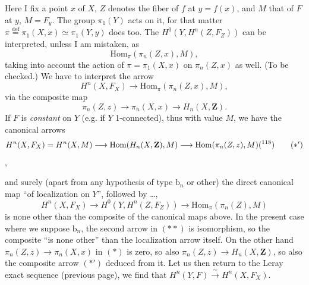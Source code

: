 Here I fix a point $x$ of $X$, $Z$ denotes the fiber of $f$ at $y=f(x)$, and $M$ that of $F$ at $y$, $M=F_y$. The group $\pi_1(Y)$ acts on it, for that matter $\pi \overset{\text{def}}{=} \pi_1(X,x) \simeq \pi_1(Y,y)$ does too. The $H^0(Y,H^n(Z,F_Z))$ can be interpreted, unless I am mistaken, as
\[
\mathrm{Hom}_\pi(\pi_n(Z,x),M),
\]
taking into account the action of $\pi=\pi_1(X,x)$ on $\pi_n(Z,x)$ as well. (To be checked.) We have to interpret the arrow
\[
H^n(X,F_X) \longrightarrow \mathrm{Hom}_\pi(\pi_n(Z,x),M),
\]
via the composite map 
\[
\pi_n(Z,z) \longrightarrow \pi_n(X,x) \longrightarrow H_n(X,\mathbf{Z}). \tag*{$(*)$}
\]
If $F$ is \textit{constant} on $Y$ (e.g. if $Y$ 1-connected), thus with value $M$, we have the canonical arrows
\[
H^n(X,F_X) = H^n(X,M) \longrightarrow \mathrm{Hom}(H_n(X,\mathbf{Z}),M) \longrightarrow \mathrm{Hom}(\pi_n(Z,z),M)\text{(\footnotemark[118])} \tag*{$(*')$}
\]
,

and surely (apart from any hypothesis of type $\mathrm{b}_n$ or other) the direct canonical map ``of localization on $Y$'', followed by \dots,
\[
H^n(X,F_X) \longrightarrow H^0(Y,H^n(Z,F_Z)) \longrightarrow \mathrm{Hom}_\pi(\pi_n(Z),M) \tag*{$(**)$}
\]
is none other than the composite of the canonical maps above. In the present case where we suppose $\mathrm{b}_n$, the second arrow in $(**)$ is isomorphism, so the composite ``is none other'' than the localization arrow itself. On the other hand $\pi_n(Z,z) \longrightarrow \pi_n(X,x)$ in $(*)$ is zero, so also $\pi_n(Z,z) \longrightarrow H_n(X,\mathbf{Z})$, so also the composite arrow $(*')$ deduced from it. Let us then return to the Leray exact sequence (previous page), we find that $H^n(Y,F) \xrightarrow{\ \sim\ } H^n(X,F_X)$.

